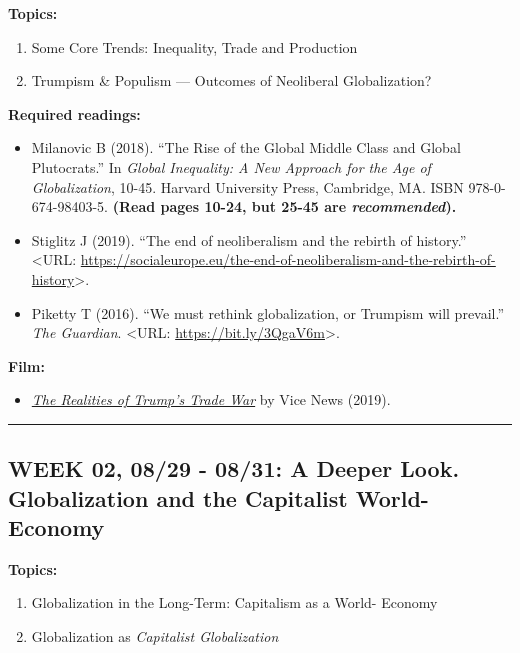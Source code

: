 \documentclass[11pt,]{article}
\providecommand{\tightlist}{%
  \setlength{\itemsep}{0pt}\setlength{\parskip}{0pt}}
\begin{document}
\textbf{Topics:}

\begin{enumerate}
\def\labelenumi{(\arabic{enumi})}
\tightlist
\item
  Some Core Trends: Inequality, Trade and Production
\item
  Trumpism \& Populism --- Outcomes of Neoliberal Globalization?
\end{enumerate}

\textbf{Required readings:}

\begin{itemize}
\item
  Milanovic B (2018). ``The Rise of the Global Middle Class and Global
  Plutocrats.'' In \emph{Global Inequality: A New Approach for the Age
  of Globalization}, 10-45. Harvard University Press, Cambridge, MA.
  ISBN 978-0-674-98403-5. \textbf{(Read pages 10-24, but 25-45 are
  \emph{recommended}).}
\item
  Stiglitz J (2019). ``The end of neoliberalism and the rebirth of
  history.'' \textless URL:
  \url{https://socialeurope.eu/the-end-of-neoliberalism-and-the-rebirth-of-history}\textgreater.
\item
  Piketty T (2016). ``We must rethink globalization, or Trumpism will
  prevail.'' \emph{The Guardian}. \textless URL:
  \url{https://bit.ly/3QgaV6m}\textgreater.
\end{itemize}

\textbf{Film:}

\begin{itemize}
\tightlist
\item
  \href{https://www.youtube.com/watch?v=9wjjQ55S4Nc}{\emph{The Realities
  of Trump's Trade War}} by Vice News (2019).
\end{itemize}

\bigbreak
\hrule

\hypertarget{week-02-0829---0831-a-deeper-look.-globalization-and-the-capitalist-world-economy}{%
\subsection{WEEK 02, 08/29 - 08/31: A Deeper Look. Globalization and the
Capitalist
World-Economy}\label{week-02-0829---0831-a-deeper-look.-globalization-and-the-capitalist-world-economy}}

\textbf{Topics:}

\begin{enumerate}
\def\labelenumi{(\arabic{enumi})}
\tightlist
\item
  Globalization in the Long-Term: Capitalism as a World- Economy
\item
  Globalization as \emph{Capitalist Globalization}
\end{enumerate}
\end{document}
